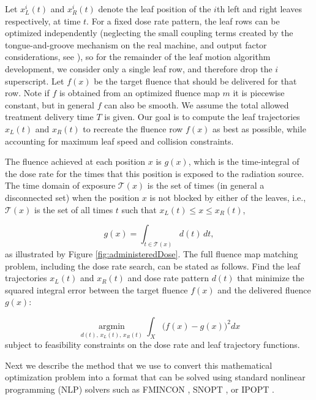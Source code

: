 \documentclass{iopart}
\begin{document}
Let $x^i_L(t)$ and $x^i_R(t)$ denote the leaf position of the $i$th left and right leaves respectively, at time $t$. For a fixed dose rate pattern, the leaf rows can be optimized independently (neglecting the small coupling terms created by the tongue-and-groove mechanism on the real machine, and output factor considerations, see \cite{unkvmatreview}), so for the remainder of the leaf motion algorithm development, we consider only a single leaf row, and therefore drop the $i$ superscript. Let $f(x)$ be the target fluence that should be delivered for that row. Note if $f$ is obtained from an optimized fluence map $m$ it is piecewise constant, but in general $f$ can also be smooth. We assume the total allowed treatment delivery time $T$ is given. Our goal is to compute the leaf trajectories $x_L(t)$ and $x_R(t)$  to recreate the fluence row $f(x)$ as best as possible, while accounting for maximum leaf speed and collision constraints. 

The fluence achieved at each position $x$ is $g(x)$, which is the time-integral of the dose rate for the times that this position is exposed to the radiation source.
The time domain of exposure $\mathcal{T}(x)$ is the set of times (in general a disconnected set) when the position $x$ is not blocked by either of the leaves, i.e.,
$\mathcal{T}(x)$ is the set of all times $t$ such that $x_L(t) \le x \leq x_R(t)$,

\begin{equation}
g(x) = \int_{t \in \mathcal{T}(x)} \! d(t) \, dt ,
\label{eqn:deliveredFluenceDose}
\end{equation}
as illustrated by Figure \ref{fig:administeredDose}.
The full fluence map matching problem, including the dose rate search, can be stated as follows. Find the leaf trajectories $x_L(t)$ and $x_R(t)$ and dose rate pattern $d(t)$
that minimize the squared integral error between the target fluence $f(x)$ and the delivered fluence $g(x)$:

\begin{equation}
\underset{d(t), \, x_L(t), \, x_R(t)}{\operatorname{argmin}}
\int_X \bigg(f(x) - g(x)\bigg)^2 dx 
\label{eqn:fluenceMapOptimization}
\end{equation}
\noindent subject to feasibility constraints on the dose rate and leaf trajectory functions.



Next we describe the method that we use to convert this mathematical optimization problem into a format that can be solved using standard nonlinear programming (NLP) solvers such as FMINCON \cite{MatlabOptimizationToolbox2014}, SNOPT \cite{Snopt7}, or IPOPT \cite{Wachter2006}.
\end{document}
